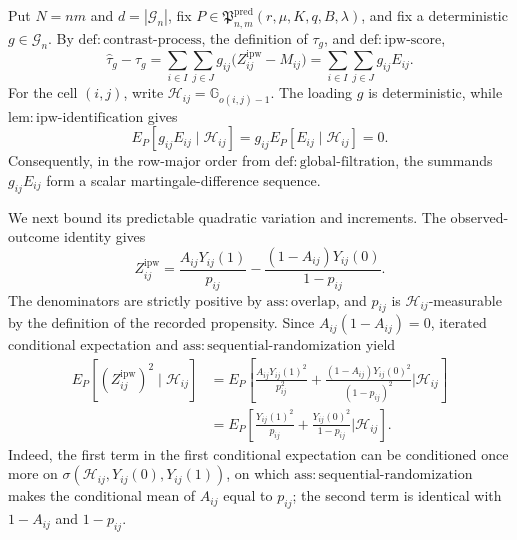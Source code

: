 Put \(N=nm\) and \(d=|\mathcal G_n|\), fix \(P\in\mathfrak P^{\mathrm{pred}}_{n,m}(r,\mu,K,q,B,\lambda)\), and fix a deterministic \(g\in\mathcal G_n\).  By \(\mathrm{def:contrast\mbox{-}process}\), the definition of \(\tau_g\), and \(\mathrm{def:ipw\mbox{-}score}\),
\[
 \widehat\tau_g-\tau_g
 =\sum_{i\in I}\sum_{j\in J}g_{ij}
   \bigl(Z^{\mathrm{ipw}}_{ij}-M_{ij}\bigr)
 =\sum_{i\in I}\sum_{j\in J}g_{ij}E_{ij}.
\]
For the cell \((i,j)\), write \(\mathcal H_{ij}=\mathbb G_{o(i,j)-1}\).  The loading \(g\) is deterministic, while \(\mathrm{lem:ipw\mbox{-}identification}\) gives
\[
 E_P[g_{ij}E_{ij}\mid\mathcal H_{ij}]
 =g_{ij}E_P[E_{ij}\mid\mathcal H_{ij}]=0.
\]
Consequently, in the row-major order from \(\mathrm{def:global\mbox{-}filtration}\), the summands \(g_{ij}E_{ij}\) form a scalar martingale-difference sequence.

We next bound its predictable quadratic variation and increments.  The observed-outcome identity gives
\[
 Z^{\mathrm{ipw}}_{ij}
 =\frac{A_{ij}Y_{ij}(1)}{p_{ij}}
  -\frac{(1-A_{ij})Y_{ij}(0)}{1-p_{ij}}.
\]
The denominators are strictly positive by \(\mathrm{ass:overlap}\), and \(p_{ij}\) is \(\mathcal H_{ij}\)-measurable by the definition of the recorded propensity.  Since \(A_{ij}(1-A_{ij})=0\), iterated conditional expectation and \(\mathrm{ass:sequential\mbox{-}randomization}\) yield
\[
\begin{aligned}
 E_P\!\left[(Z^{\mathrm{ipw}}_{ij})^2\mid\mathcal H_{ij}\right]
 &=E_P\!\left[
   \frac{A_{ij}Y_{ij}(1)^2}{p_{ij}^2}
   +\frac{(1-A_{ij})Y_{ij}(0)^2}{(1-p_{ij})^2}
   \mathrel{\Big|}\mathcal H_{ij}\right]\\
 &=E_P\!\left[
   \frac{Y_{ij}(1)^2}{p_{ij}}
   +\frac{Y_{ij}(0)^2}{1-p_{ij}}
   \mathrel{\Big|}\mathcal H_{ij}\right].
\end{aligned}
\]
Indeed, the first term in the first conditional expectation can be conditioned once more on \(\sigma(\mathcal H_{ij},Y_{ij}(0),Y_{ij}(1))\), on which \(\mathrm{ass:sequential\mbox{-}randomization}\) makes the conditional mean of \(A_{ij}\) equal to \(p_{ij}\); the second term is identical with \(1-A_{ij}\) and \(1-p_{ij}\).

